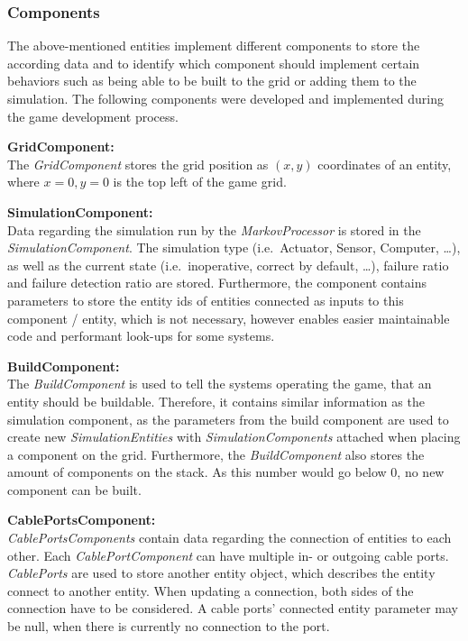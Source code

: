 \subsubsection{Components}\label{subsubsec:components2}
The above-mentioned entities implement different components to store the according data and to identify which component
should implement certain behaviors such as being able to be built to the grid or adding them to the simulation.
The following components were developed and implemented during the game development process.

\textbf{GridComponent:} \\
The \textit{GridComponent} stores the grid position as $(x,y)$ coordinates of an entity, where $x=0, y=0$ is the top left of the game grid.

\textbf{SimulationComponent:} \\
Data regarding the simulation run by the \textit{MarkovProcessor} is stored in the \textit{SimulationComponent}.
The simulation type (i.e.\ Actuator, Sensor, Computer, \ldots), as well as the current state (i.e.\ inoperative, correct by default, \ldots), failure
ratio and failure detection ratio are stored.
Furthermore, the component contains parameters to store the entity ids of entities connected as inputs to this component / entity, which is
not necessary, however enables easier maintainable code and performant look-ups for some systems.

\textbf{BuildComponent:} \\
The \textit{BuildComponent} is used to tell the systems operating the game, that an entity should be buildable.
Therefore, it contains similar information as the simulation component, as the parameters from the build component are used
to create new \textit{SimulationEntities} with \textit{SimulationComponents} attached when placing a component on the grid.
Furthermore, the \textit{BuildComponent} also stores the amount of components on the stack.
As this number would go below 0, no new component can be built.

\textbf{CablePortsComponent:} \\
\textit{CablePortsComponents} contain data regarding the connection of entities to each other.
Each \textit{CablePortComponent} can have multiple in- or outgoing cable ports.
\textit{CablePorts} are used to store another entity object, which describes the entity connect to another entity.
When updating a connection, both sides of the connection have to be considered.
A cable ports' connected entity parameter may be null, when there is currently no connection to the port.

